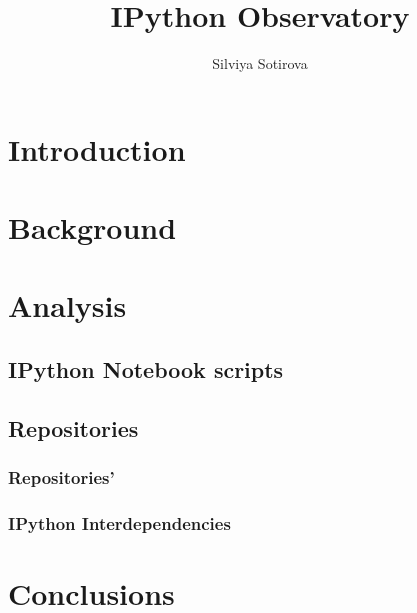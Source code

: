 \documentclass{example/mpaper}
\begin{document}
\title{IPython Observatory}
\author{Silviya Sotirova}

\maketitle

\begin{abstract}

\end{abstract}

\section{Introduction}


\section{Background}


\section{Analysis}
\subsection{IPython Notebook scripts}
\subsection{Repositories}
\subsubsection{Repositories' }
\subsubsection{IPython Interdependencies}



\section{Conclusions}





\end{document}
